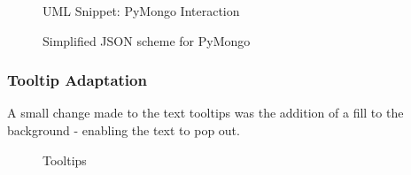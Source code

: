 \documentclass[a4paper,11pt,titlepage]{article}
\begin{document}
	\begin{figure}[H]
    			\caption{UML Snippet: PyMongo Interaction}%
	\end{figure}		
	
	\begin{figure}[H]
    			\caption{Simplified JSON scheme for PyMongo}%
	\end{figure}
	
	\subsubsection{Tooltip Adaptation}
A small change made to the text tooltips was the addition of a fill to the background - enabling the text to pop out.
	\par 
	
	\begin{figure}[H]
    			\caption{Tooltips}%
	\end{figure}	
	
\end{document}
